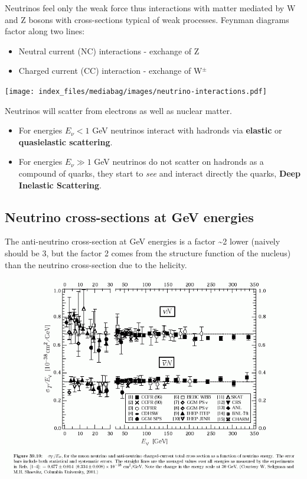 \documentclass[
  letterpaper,
  DIV=11,
  numbers=noendperiod]{scrreprt}
\providecommand{\tightlist}{%
  \setlength{\itemsep}{0pt}\setlength{\parskip}{0pt}}\usepackage{longtable,booktabs,array}
\begin{document}
Neutrinos feel only the weak force thus interactions with matter
mediated by W and Z bosons with cross-sections typical of weak
processes. Feynman diagrams factor along two lines:

\begin{itemize}
\tightlist
\item
  Neutral current (NC) interactions - exchange of Z
\item
  Charged current (CC) interaction - exchange of W\(^{\pm}\)
\end{itemize}

\texttt{[image: index\_files/mediabag/images/neutrino-interactions.pdf]}

Neutrinos will scatter from electrons as well as nuclear matter.

\begin{itemize}
\item
  For energies \(E_\nu < 1\) GeV neutrinos interact with hadronds via
  \textbf{elastic} or \textbf{quasielastic scattering}.
\item
  For energies \(E_\nu \gg 1\) GeV neutrinos do not scatter on hadronds
  as a compound of quarks, they start to \emph{see} and interact
  directly the quarks, \textbf{Deep Inelastic Scattering}.
\end{itemize}

\subsection*{Neutrino cross-sections at GeV
energies}\label{neutrino-cross-sections-at-gev-energies}

The anti-neutrino cross-section at GeV energies is a factor
\textasciitilde2 lower (naively should be 3, but the factor 2 comes from
the structure function of the nucleus) than the neutrino cross-section
due to the helicity.

\includegraphics{images/pdg_plot.gif}
\end{document}
